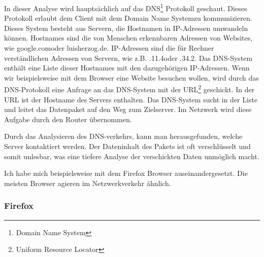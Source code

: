 \documentclass[12pt]{article}
\begin{document}
In dieser Analyse wird hauptsächlich auf das DNS\footnote{Domain Name System} Protokoll geschaut. Dieses Protokoll erlaubt dem Client mit dem \glq Domain Name System\grq zu kommunizieren. Dieses System besteht aus Servern, die Hostnamen in IP-Adressen umwandeln können. Hostnames sind die von Menschen erkennbaren Adressen von Websites, wie \glq google.com\grq oder \glq luisherzog.de\grq. IP-Adressen sind die für Rechner verständlichen Adressen von Servern, wie z.B. .11.4\grq oder .34.2\grq. Das DNS-System enthält eine Liste dieser Hostnames mit den dazugehörigen IP-Adressen. Wenn wir beispielsweise mit dem Browser eine Website besuchen wollen, wird durch das DNS-Protokoll eine Anfrage an das DNS-System mit der URL\footnote{Uniform Resource Locator} geschickt. In der URL ist der Hostname des Servers enthalten. Das DNS-System sucht in der Liste und leitet das Datenpaket auf den Weg zum Zielserver.\cite{dns-cloudflare} Im Netzwerk wird diese Aufgabe durch den Router übernommen.

Durch das Analysieren des DNS-verkehrs, kann man herausgefunden, welche Server kontaktiert werden. Der Dateninhalt des Pakets ist oft verschlüsselt und somit unlesbar, was eine tiefere Analyse der verschickten Daten unmöglich macht. 

Ich habe mich beispielsweise mit dem Firefox Browser auseinandergesetzt. Die meisten Browser agieren im Netzwerkverkehr ähnlich.

\subsubsection{Firefox}
\end{document}
